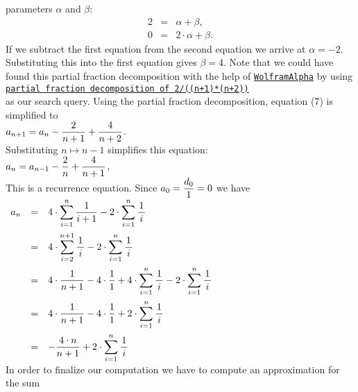parameters $\alpha$ and $\beta$:
\begin{eqnarray*}
  2 & = & \alpha + \beta, \\
  0 & = & 2 \cdot \alpha + \beta.
\end{eqnarray*}
If we subtract the first equation from the second equation we arrive at
$\alpha = -2$.  Substituting this into the first equation gives $\beta = 4$.
Note that we could have found this partial fraction decomposition with the help of
\href{wolframalpha.com}{\texttt{WolframAlpha}} by using
\\[0.2cm]
\hspace*{1.3cm}
\href{https://www.wolframalpha.com/input?i=partial+fraction+decomposition+of+2%2F%28%28n%2B1%29*%28n%2B2%29%29}{\texttt{partial fraction decomposition of 2/((n+1)*(n+2))}}
\\[0.2cm]
as our search query.  Using the partial fraction decomposition,  equation (7) is simplified to
\\[0.2cm]
\hspace*{1.3cm}
$\displaystyle a_{n+1} = a_{n} - \frac{2}{n+1} + \frac{4}{n+2}$.
\\[0.2cm] 
Substituting $n \mapsto n-1$ simplifies this equation: 
\\[0.2cm]
\hspace*{1.3cm}
$\displaystyle a_{n} = a_{n-1} - \frac{2}{n} + \frac{4}{n+1}$,
\\[0.2cm] 
This is a  recurrence equation. 
Since $a_0 = \displaystyle\frac{d_0}{1} = 0$
we have
\\[0.2cm]
\hspace*{1.3cm}
$
\begin{array}{lcl}
 a_{n} & = & \displaystyle 4 \cdot \sum_{i=1}^n \frac{1}{i+1} - 2 \cdot \sum_{i=1}^n \frac{1}{\,i\,} \\[0.5cm]
       & = & \displaystyle 4 \cdot \sum_{i=2}^{n+1} \frac{1}{\,i\,} - 2 \cdot \sum_{i=1}^n \frac{1}{\,i\,} \\[0.5cm]
       & = & \displaystyle 4 \cdot \frac{1}{n+1} - 4 \cdot \frac{1}{1} + 4 \cdot \sum_{i=1}^{n} \frac{1}{\,i\,} - 2 \cdot \sum_{i=1}^n \frac{1}{\,i\,} \\[0.5cm]
       & = & \displaystyle 4 \cdot \frac{1}{n+1} - 4 \cdot \frac{1}{1} + 2 \cdot \sum_{i=1}^{n} \frac{1}{\,i\,}  \\[0.5cm]
       & = & \displaystyle - \frac{4 \cdot n}{n+1}  + 2 \cdot \sum_{i=1}^{n} \frac{1}{\,i\,}  
\end{array}
$
\\[0.2cm]
In order to finalize our computation we have to compute an approximation for the sum

